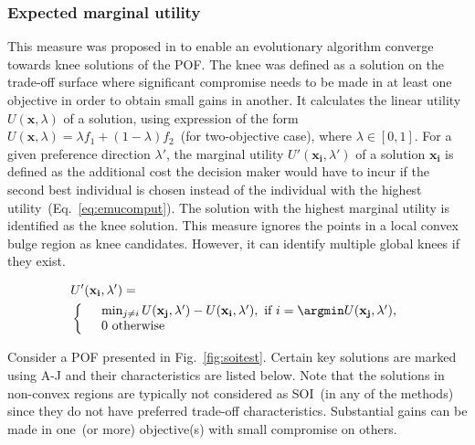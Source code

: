 \subsubsection{Expected marginal utility} This measure was proposed in \cite{branke2004finding} to enable an evolutionary algorithm converge towards knee solutions of the POF. The knee was defined as a solution on the trade-off surface where significant compromise needs to be made in at least one objective in order to obtain small gains in another. It calculates the linear utility $U(\mathbf{x},\lambda)$ of a solution, using expression of the form $U(\mathbf{x},\lambda) = \lambda f_1 + (1-\lambda)f_2$~(for two-objective case), where $\lambda \in [0,1]$. For a given preference direction $\lambda'$, the marginal utility $U'(\mathbf{x_i},\lambda')$ of a solution $\mathbf{x_i}$ is defined as the additional cost the decision maker would have to incur if the second best individual is chosen instead of the individual with the highest utility~(Eq.~\ref{eq:emucomput}). The solution with the highest marginal utility is identified as the knee solution. This measure ignores the points in a local convex bulge region as knee candidates. However, it can identify multiple global knees if they exist. 

\begin{equation}
\begin{aligned}
& U'(\mathbf{x_i},\lambda') = \\ 
& \left\{
\begin{array}{rl}
& \min_{j\neq i} U(\mathbf{x_j},\lambda') - U(\mathbf{x_i},\lambda'), \text{ if } i = \argmin U(\mathbf{x_j},\lambda'),\\
& 0 \text{ otherwise } 
\end{array} \right.
\end{aligned}
\label{eq:emucomput}
\end{equation}

Consider a POF presented in Fig.~\ref{fig:soitest}. Certain key solutions are marked using A-J and their characteristics are listed below. Note that the solutions in non-convex regions are typically not considered as SOI~(in any of the methods) since they do not have preferred trade-off characteristics. Substantial gains can be made in one~(or more) objective(s) with small compromise on others.

